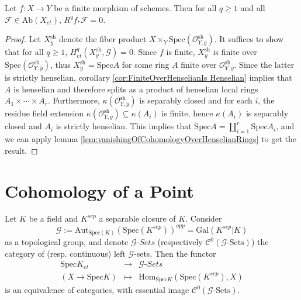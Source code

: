 \begin{proposition} \label{prop:FiniteHigherDirectImagesVanish}
Let $f: X\to Y$ be a finite morphism of schemes. Then for all $q\geq 1$ and all 
$\mathcal{F}\in \text{Ab}(X_{et})$, $R^q f_*\mathcal{F}=0$. 
\end{proposition}

\begin{proof}
Let $X_{\bar y}^\text{sh}$ denote the fiber product $X\times_Y 
\text{Spec}(\mathcal{O}_{Y, \bar y}^\text{sh})$. It suffices to show that for 
all $q\geq 1$, $H_{et}^q(X_{\bar y}^\text{sh}, \mathcal{G})=0$. Since $f$ is 
finite, $X_{\bar y}^\text{sh}$ is finite over $\text{Spec}(\mathcal{O}_{Y, \bar 
y}^\text{sh})$, thus $X_{\bar y}^\text{sh} = \text{Spec} A$ for some ring $A$ 
finite over $\mathcal{O}_{Y, \bar y}^\text{sh}$. Since the latter is strictly 
henselian, corollary \ref{cor:FiniteOverHenselianIs Henselian} implies that $A$ 
is henselian and therefore splits as a product of henselian local rings $A_1 
\times \cdots \times A_r$. Furthermore, $\kappa(\mathcal{O}_{Y, \bar 
y}^\text{sh})$ is separably closed and for each $i$, the residue field 
extension $\kappa(\mathcal{O}_{Y, \bar y}^\text{sh}) \subseteq \kappa(A_i)$ is 
finite, hence $\kappa(A_i)$ is separably closed  and $A_i$ is strictly 
henselian. This implies that $\text{Spec} A = \coprod_{i=1}^r \text{Spec} A_i$, 
and we can apply lemma \ref{lem:vanishingOfCohomologyOverHenselianRings} to get 
the result.
\end{proof}

\section{Cohomology of a Point}
\label{section-cohomology-point}

\begin{lemma}
Let $K$ be a field and $K^{sep}$ a separable closure of $K$. Consider
$$
\mathcal{G} := \text{Aut}_{\text{Spec}(K)}(\text{Spec}(K^{sep}))^{opp}  = 
\text{Gal}(K^{sep} | K)
$$
as a topological group, and denote $\mathcal{G}\textit{-Sets}$ (respectively 
$\mathcal{C}^0(\mathcal{G}\text{-Sets})$) the category of (resp. continuous) 
left $\mathcal{G}$-sets. Then the functor
$$
\begin{array}{ccl}
\text{Spec} K _{et} &  \longrightarrow & \mathcal{G}\textit{-Sets} \\
(X\to\text{Spec} K) & \longmapsto & \text{Hom}_{\text{Spec} 
K}\left(\text{Spec}(K^{sep}), X\right)
\end{array}
$$
is an equivalence of categories, with essential image 
$\mathcal{C}^0(\mathcal{G}\text{-Sets})$.
\end{lemma}

